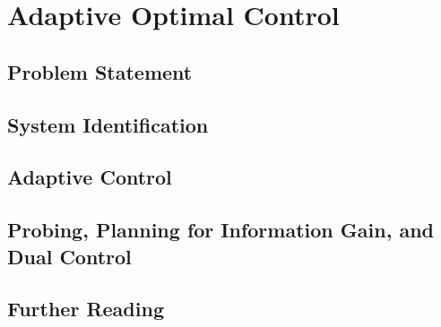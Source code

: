 \section{Adaptive Optimal Control}


\subsection{Problem Statement}



\subsection{System Identification}


\subsection{Adaptive Control}


\subsection{Probing, Planning for Information Gain, and Dual Control}



\subsection{Further Reading}